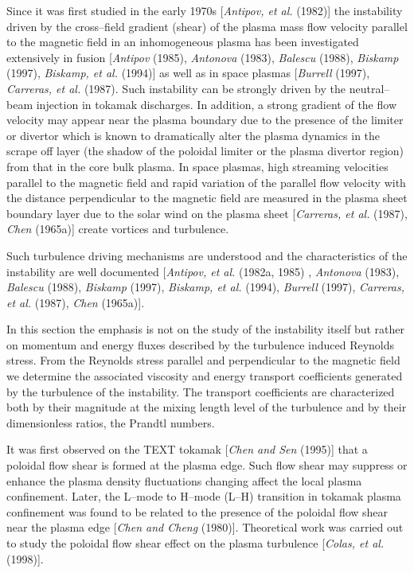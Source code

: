 \documentclass[a4paper,openany,12pt]{book}
\begin{document}
Since it was first studied in the early 1970s [\emph{Antipov, et al.} (1982)] the instability driven by the cross--field gradient (shear) of the plasma mass flow velocity parallel to the magnetic field in an inhomogeneous plasma has been investigated extensively in fusion [\emph{Antipov} (1985), \emph{Antonova} (1983), \emph{Balescu} (1988), \emph{Biskamp} (1997), 
\emph{Biskamp, et al.} (1994)] as well as in space plasmas [\emph{Burrell} (1997), \emph{Carreras, et al.} (1987). Such instability can be strongly driven by the neutral--beam injection in tokamak discharges. In addition, a strong gradient of the flow velocity may appear near the plasma boundary due to the presence of the limiter or divertor which is known to dramatically alter the plasma dynamics in the scrape off layer (the shadow of the poloidal limiter or the plasma divertor region) from that in the core bulk plasma. In space plasmas, high streaming velocities parallel to the magnetic field and rapid variation of the parallel flow velocity with the distance perpendicular to the magnetic field are measured in the plasma sheet boundary layer due to the solar wind on the plasma sheet [\emph{Carreras, et al.} (1987), \emph{Chen} (1965a)] create vortices and turbulence.

Such turbulence driving mechanisms are understood and the characteristics of the instability are well documented [\emph{Antipov, et al.} (1982a, 1985) , \emph{Antonova} (1983), \emph{Balescu} (1988), \emph{Biskamp} (1997), \emph{Biskamp, et al.} (1994), \emph{Burrell} (1997), \emph{Carreras, et al.} (1987), \emph{Chen} (1965a)]. 

In this section the emphasis is not on the study of the instability itself but rather on momentum and energy fluxes described by the turbulence induced Reynolds stress. From the Reynolds stress parallel and perpendicular to the magnetic field we determine the associated viscosity and energy transport coefficients generated by the turbulence of the instability. The transport coefficients are characterized both by their magnitude at the mixing length level of the turbulence and by their dimensionless ratios, the Prandtl numbers.

It was first observed on the TEXT tokamak [\emph{Chen and Sen} (1995)] that a poloidal flow shear is formed at the plasma edge. Such flow shear may suppress or enhance the plasma density fluctuations changing affect the local plasma confinement. Later, the L--mode to H--mode (L--H) transition in tokamak plasma confinement was found to be related to the presence of the poloidal flow shear near the plasma edge [\emph{Chen and Cheng} (1980)]. Theoretical work was carried out to study the poloidal flow shear effect on the plasma turbulence [\emph{Colas, et al.} (1998)].
\end{document}
